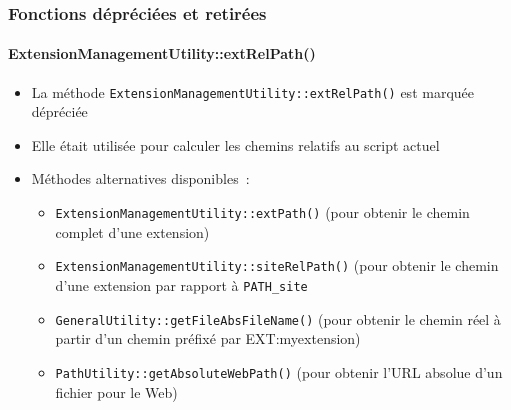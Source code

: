 \begin{frame}[fragile]
	\frametitle{Fonctions dépréciées et retirées}
	\framesubtitle{ExtensionManagementUtility::extRelPath()}

	\begin{itemize}

		\item La méthode \texttt{ExtensionManagementUtility::extRelPath()} est marquée dépréciée
		\item Elle était utilisée pour calculer les chemins relatifs au script actuel
		\item Méthodes alternatives disponibles~:

			\begin{itemize}
				\item \texttt{ExtensionManagementUtility::extPath()}\newline
					(pour obtenir le chemin complet d'une extension)
				\item \texttt{ExtensionManagementUtility::siteRelPath()}\newline
					(pour obtenir le chemin d'une extension par rapport à \texttt{PATH\_site}
				\item \texttt{GeneralUtility::getFileAbsFileName()}\newline
					(pour obtenir le chemin réel à partir d'un chemin préfixé par EXT:myextension)
				\item \texttt{PathUtility::getAbsoluteWebPath()}\newline
					(pour obtenir l'URL absolue d'un fichier pour le Web)
			\end{itemize}

	\end{itemize}

\end{frame}


